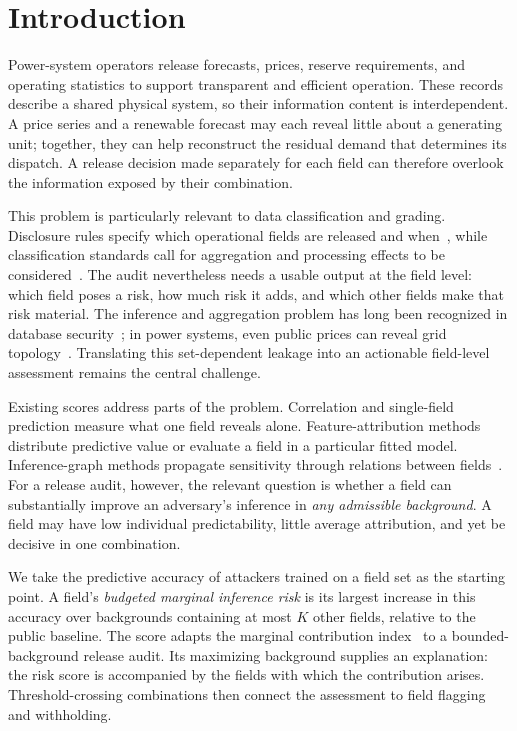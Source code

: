 \section{Introduction}\label{sec:intro}
Power-system operators release forecasts, prices, reserve requirements, and operating statistics to support transparent and efficient operation. These records describe a shared physical system, so their information content is interdependent. A price series and a renewable forecast may each reveal little about a generating unit; together, they can help reconstruct the residual demand that determines its dispatch. A release decision made separately for each field can therefore overlook the information exposed by their combination.

This problem is particularly relevant to data classification and grading. Disclosure rules specify which operational fields are released and when~\cite{nea2024disclosure}, while classification standards call for aggregation and processing effects to be considered~\cite{gbt43697}. The audit nevertheless needs a usable output at the field level: which field poses a risk, how much risk it adds, and which other fields make that risk material. The inference and aggregation problem has long been recognized in database security~\cite{lunt1989aggregation,farkas2002inference}; in power systems, even public prices can reveal grid topology~\cite{kekatos2014topology}. Translating this set-dependent leakage into an actionable field-level assessment remains the central challenge.

Existing scores address parts of the problem. Correlation and single-field prediction measure what one field reveals alone. Feature-attribution methods distribute predictive value or evaluate a field in a particular fitted model. Inference-graph methods propagate sensitivity through relations between fields~\cite{hu2026ignn}. For a release audit, however, the relevant question is whether a field can substantially improve an adversary's inference in \emph{any admissible background}. A field may have low individual predictability, little average attribution, and yet be decisive in one combination.

We take the predictive accuracy of attackers trained on a field set as the starting point. A field's \emph{budgeted marginal inference risk} is its largest increase in this accuracy over backgrounds containing at most $K$ other fields, relative to the public baseline. The score adapts the marginal contribution index~\cite{catav2021mci} to a bounded-background release audit. Its maximizing background supplies an explanation: the risk score is accompanied by the fields with which the contribution arises. Threshold-crossing combinations then connect the assessment to field flagging and withholding.


